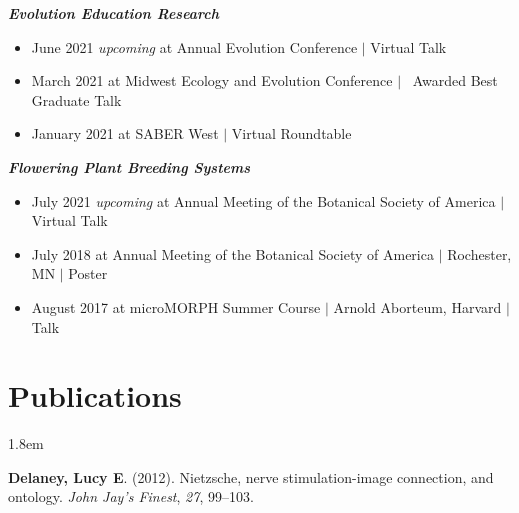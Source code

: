 \documentclass[]{article}
\newlength{\cslhangindent}
\newenvironment{cslreferences}
{\setlength{\parindent}{0pt}
\everypar{\setlength{\hangindent}{\cslhangindent}}\ignorespaces}
{\par}
\begin{document}
\textit{\textbf{Evolution Education Research}}
\begin{itemize}[label=$\mathwitch*$]
\item{June 2021 \textit{upcoming} at Annual Evolution Conference $\vert$ Virtual Talk 
\hspace{0.3mm} \href{https://ledelaney.org/talks/2021evolution}{\faImages} \href{https://github.com/ledelaney/06-21-Evolution}{\faGithub}}
\item{March 2021 at Midwest Ecology and Evolution Conference $\vert$ \faAward\ Awarded Best Graduate Talk \hspace{0.3mm} \href{https://ledelaney.org/talks/2021meec/}{\faImages} \href{https://github.com/ledelaney/03-21-MEEC}{\faGithub}}
\item{January 2021 at SABER West $\vert$ Virtual Roundtable \hspace{0.3mm} \href{https://ledelaney.org/talks/2021saberw/}{\faImages} \href{https://github.com/ledelaney/01-21-SABERwest}{\faGithub}}
\end{itemize}

\vspace{2mm}

\textit{\textbf{Flowering Plant Breeding Systems}}

\begin{itemize}[label=$\mathwitch*$]
\item{July 2021 \textit{upcoming} at Annual Meeting of the Botanical Society of America $\vert$ Virtual Talk}
\item{July 2018 at Annual Meeting of the Botanical Society of America $\vert$ Rochester, MN $\vert$ Poster \hspace{0.3mm} \href{https://ledelaney.org/static/posters/poster.png}{\faFileImage}}
\item{August 2017 at microMORPH Summer Course $\vert$ Arnold Aborteum, Harvard $\vert$ Talk \hspace{0.3mm} \href{https://www.dropbox.com/s/o7hcg5riw97wf9i/08-2017-microMORPH.pdf?dl=1}{\faImages}}
\end{itemize}
\vspace{1mm}

\section{Publications}

\vspace{3mm}
\leftskip 1.8em

\begin{cslreferences}
\textbf{Delaney, Lucy E}. (2012). Nietzsche, nerve stimulation-image connection, and ontology. \emph{John Jay's Finest}, \emph{27}, 99--103. \href{https://ledelaney.org/static/docs/Delaney-JJAYFinest.pdf}{\faFile}\\
\end{cslreferences}
\end{document}
